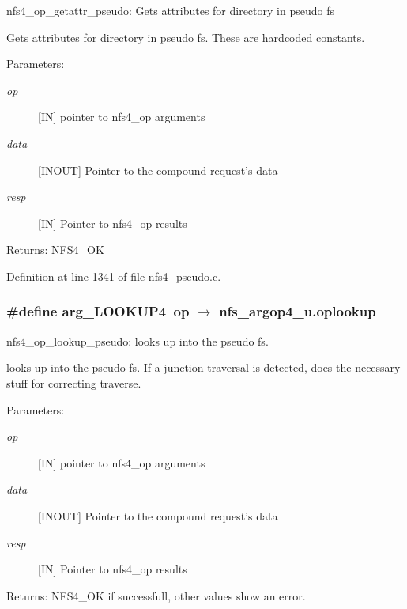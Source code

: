nfs4\_\-op\_\-getattr\_\-pseudo: Gets attributes for directory in pseudo fs

Gets attributes for directory in pseudo fs. These are hardcoded constants.

\begin{Desc}
\item[Parameters:]
\begin{description}
\item[{\em op}][IN] pointer to nfs4\_\-op arguments \item[{\em data}][INOUT] Pointer to the compound request's data \item[{\em resp}][IN] Pointer to nfs4\_\-op results\end{description}
\end{Desc}
\begin{Desc}
\item[Returns:]NFS4\_\-OK \end{Desc}


Definition at line 1341 of file nfs4\_\-pseudo.c.
\subsubsection{\setlength{\rightskip}{0pt plus 5cm}\#define arg\_\-LOOKUP4\ op $\rightarrow$ nfs\_\-argop4\_\-u.oplookup}\label{nfs4__pseudo_8c_a7}


nfs4\_\-op\_\-lookup\_\-pseudo: looks up into the pseudo fs.

looks up into the pseudo fs. If a junction traversal is detected, does the necessary stuff for correcting traverse.

\begin{Desc}
\item[Parameters:]
\begin{description}
\item[{\em op}][IN] pointer to nfs4\_\-op arguments \item[{\em data}][INOUT] Pointer to the compound request's data \item[{\em resp}][IN] Pointer to nfs4\_\-op results\end{description}
\end{Desc}
\begin{Desc}
\item[Returns:]NFS4\_\-OK if successfull, other values show an error. \end{Desc}


